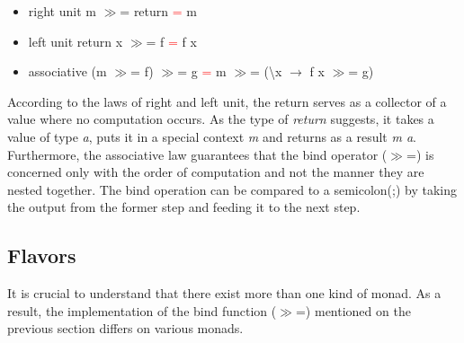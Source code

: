 \documentclass[a4paper, onecolumn]{article}
\begin{document}
\begin{itemize}
    \item right unit \hspace{20mm} m $\gg$= return \textcolor{red}{=} m 
    \item left unit \hspace{20mm} return x $\gg$= f \textcolor{red}{=} f x   
    \item associative \hspace{15mm} (m $\gg$= f) $\gg$= g \textcolor{red}{=} m $\gg$= (\textbackslash x $\rightarrow$ f x $\gg$= g) 
\end{itemize}
According to the laws of right and left unit, the return serves as a collector of a value where no computation occurs. As the type of \textit{return} suggests, it takes a value of type \textit{a}, puts it in a special context \textit{m} and returns as a result \textit{m a}. Furthermore, the associative law guarantees that the bind operator ($\gg$=) is concerned only with the order of computation and not the manner they are nested together. The bind operation can be compared to a semicolon(;) by taking the output from the former step and feeding it to the next step.
\subsection{Flavors}

It is crucial to understand that there exist more than one kind of monad. As a result, the implementation of the bind function ($\gg$=) mentioned on the previous section differs on various monads. 
\end{document}

